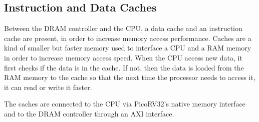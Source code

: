 \subsection{Instruction and Data Caches}
\label{subsection:caches}

Between the DRAM controller and the CPU, a data cache and an instruction cache
are present, in order to increase memory access performance. Caches are a kind
of smaller but faster memory used to interface a CPU and a RAM memory in order
to increase memory access speed. When the CPU access new data, it first checks
if the data is in the cache. If not, then the data is loaded from the RAM memory
to the cache so that the next time the processor needs to access it, it can read
or write it faster.

The caches are connected to the CPU via PicoRV32's native memory interface and
to the DRAM controller through an AXI interface.

